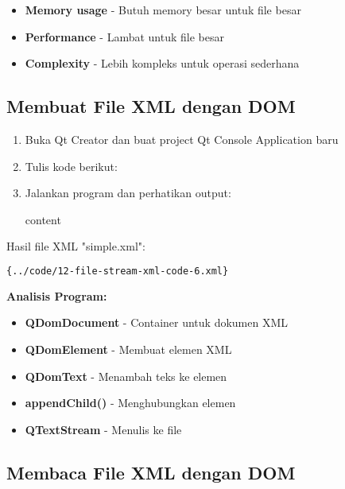 \begin{itemize}
\item \textbf{Memory usage} - Butuh memory besar untuk file besar
\item \textbf{Performance} - Lambat untuk file besar
\item \textbf{Complexity} - Lebih kompleks untuk operasi sederhana
\end{itemize}

\subsection{Membuat File XML dengan DOM}

\begin{enumerate}
\item Buka Qt Creator dan buat project Qt Console Application baru
\item Tulis kode berikut:



\item Jalankan program dan perhatikan output:

\begin{lcverbatim}
content
\end{lcverbatim}
\end{enumerate}

Hasil file XML "simple.xml":

\begin{lstlisting}[language=xml]{../code/12-file-stream-xml-code-6.xml}
\end{lstlisting}

\textbf{Analisis Program:}
\begin{itemize}
\item \textbf{QDomDocument} - Container untuk dokumen XML
\item \textbf{QDomElement} - Membuat elemen XML
\item \textbf{QDomText} - Menambah teks ke elemen
\item \textbf{appendChild()} - Menghubungkan elemen
\item \textbf{QTextStream} - Menulis ke file
\end{itemize}

\subsection{Membaca File XML dengan DOM}

